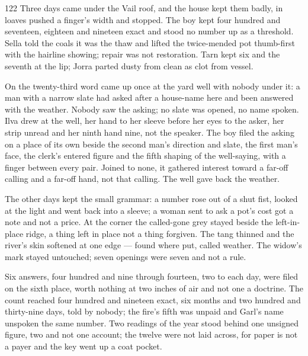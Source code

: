
\scenebreak


\scenebreak


\scenebreak

\CRtailpiece
\begin{CRchronicle}{122}
Three days came under the Vail roof, and the house kept them badly, in loaves pushed a finger’s width and stopped. The boy kept four hundred and seventeen, eighteen and nineteen exact and stood no number up as a threshold. Sella told the coals it was the thaw and lifted the twice-mended pot thumb-first with the hairline showing; repair was not restoration. Tarn kept six and the seventh at the lip; Jorra parted dusty from clean as clot from vessel.

On the twenty-third word came up once at the yard well with nobody under it: a man with a narrow slate had asked after a house-name here and been answered with the weather. Nobody saw the asking; no slate was opened, no name spoken. Ilva drew at the well, her hand to her sleeve before her eyes to the asker, her strip unread and her ninth hand nine, not the speaker. The boy filed the asking on a place of its own beside the second man’s direction and slate, the first man’s face, the clerk’s entered figure and the fifth shaping of the well-saying, with a finger between every pair. Joined to none, it gathered interest toward a far-off calling and a far-off hand, not that calling. The well gave back the weather.

The other days kept the small grammar: a number rose out of a shut fist, looked at the light and went back into a sleeve; a woman sent to ask a pot’s cost got a note and not a price. At the corner the called-gone grey stayed beside the left-in-place ridge, a thing left in place not a thing forgiven. The tang thinned and the river’s skin softened at one edge — found where put, called weather. The widow’s mark stayed untouched; seven openings were seven and not a rule.

Six answers, four hundred and nine through fourteen, two to each day, were filed on the sixth place, worth nothing at two inches of air and not one a doctrine. The count reached four hundred and nineteen exact, six months and two hundred and thirty-nine days, told by nobody; the fire’s fifth was unpaid and Garl’s name unspoken the same number. Two readings of the year stood behind one unsigned figure, two and not one account; the twelve were not laid across, for paper is not a payer and the key went up a coat pocket.


\end{CRchronicle}
